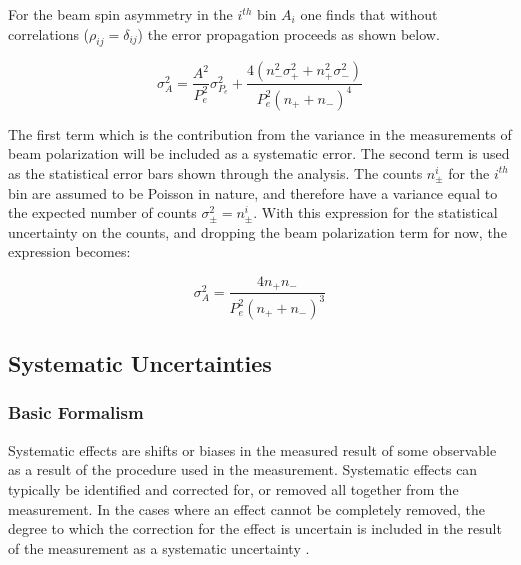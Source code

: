 For the beam spin asymmetry in the $i^{th}$ bin $A_i$ one finds that without correlations ($\rho_{ij} = \delta_{ij}$) the error propagation proceeds as shown below.

\begin{equation}
  \sigma_{A}^{2} = \frac{A^2}{P_{e}^2} \sigma_{P_{e}}^{2} + \frac{4 (n_{-}^{2} \sigma_{+}^{2}  + n_{+}^{2} \sigma_{-}^{2})}{ P_{e}^{2} (n_{+} + n_{-})^4}
\end{equation} 

The first term which is the contribution from the variance in the measurements of beam polarization will be included as a systematic error.  The second term is used as the statistical error bars shown through the analysis.  The counts $n_{\pm}^{i}$ for the $i^{th}$ bin are assumed to be Poisson in nature, and therefore have a variance equal to the expected number of counts $\sigma_{\pm}^{2} = n_{\pm}^{i}$.  With this expression for the statistical uncertainty on the counts, and dropping the beam polarization term for now, the expression becomes: 

\begin{equation}
  \sigma_{A}^{2} = \frac{4n_+ n_-}{P_{e}^{2} (n_+ + n_-)^3}
\end{equation}



\subsection*{Systematic Uncertainties}


\subsubsection*{Basic Formalism}

Systematic effects are shifts or biases in the measured result of some observable as a result of the procedure used in the measurement.  Systematic effects can typically be identified and corrected for, or removed all together from the measurement.  In the cases where an effect cannot be completely removed, the degree to which the correction for the effect is uncertain is included in the result of the measurement as a systematic uncertainty \cite{misc-barlow:2002}. \\

